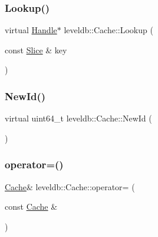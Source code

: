 \mbox{\label{classleveldb_1_1_cache_af90785205182a25cf741dc13a48d76cb}} 
\subsubsection{\texorpdfstring{Lookup()}{Lookup()}}
{\footnotesize\ttfamily virtual \mbox{\hyperlink{structleveldb_1_1_cache_1_1_handle}{Handle}}$\ast$ leveldb\+::\+Cache\+::\+Lookup (\begin{DoxyParamCaption}\item[{const \mbox{\hyperlink{classleveldb_1_1_slice}{Slice}} \&}]{key }\end{DoxyParamCaption})\hspace{0.3cm}{\ttfamily [pure virtual]}}

\mbox{\label{classleveldb_1_1_cache_ae2d79bfe747fc6c165c77398cc31e125}} 
\subsubsection{\texorpdfstring{NewId()}{NewId()}}
{\footnotesize\ttfamily virtual uint64\+\_\+t leveldb\+::\+Cache\+::\+New\+Id (\begin{DoxyParamCaption}{ }\end{DoxyParamCaption})\hspace{0.3cm}{\ttfamily [pure virtual]}}

\mbox{\label{classleveldb_1_1_cache_ae632af1297651c42d750ba2ffc0cbfb5}} 
\subsubsection{\texorpdfstring{operator=()}{operator=()}}
{\footnotesize\ttfamily \mbox{\hyperlink{classleveldb_1_1_cache}{Cache}}\& leveldb\+::\+Cache\+::operator= (\begin{DoxyParamCaption}\item[{const \mbox{\hyperlink{classleveldb_1_1_cache}{Cache}} \&}]{ }\end{DoxyParamCaption})\hspace{0.3cm}{\ttfamily [delete]}}

